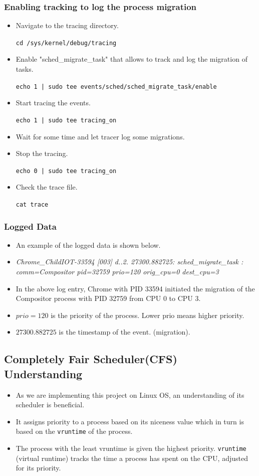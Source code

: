 \documentclass[12pt]{article}
\begin{document}
\subsubsection{Enabling tracking to log the process migration}
\begin{itemize}
    \item Navigate to the tracing directory. 
    
    \texttt{cd /sys/kernel/debug/tracing}
    \item Enable "sched\_migrate\_task" that allows to track and log the migration of tasks.

    \texttt{echo 1 | sudo tee events/sched/sched_migrate_task/enable}
    \item Start tracing the events. 
    
    \texttt{echo 1 | sudo tee tracing_on}
    \item Wait for some time and let tracer log some migrations.
    \item Stop the tracing. 
    
    \texttt{echo 0 | sudo tee tracing_on}
    \item Check the trace file. 
    
    \texttt{cat trace}
\end{itemize}
\subsubsection{Logged Data}
\begin{itemize}
    \item An example of the logged data is shown below.
    \item \textit{Chrome\_ChildIOT-33594   [003] d..2. 27300.882725: sched\_migrate\_task : comm=Compositor pid=32759 prio=120 orig\_cpu=0 dest\_cpu=3}
    \item In the above log entry, Chrome with PID 33594 initiated the migration of the Compositor process with PID 32759 from CPU 0 to CPU 3.
    \item $prio =120$ is the priority of the process. Lower prio means higher priority.
    \item $27300.882725$ is the timestamp of the event. (migration).
\end{itemize}
\subsection{Completely Fair Scheduler(CFS) Understanding}
\begin{itemize}
    \item As we are implementing this project on Linux OS, an understanding of its scheduler is beneficial.
    \item It assigns priority to a process based on its niceness value which in turn is based on the \texttt{vruntime} of the process.
    \item The process with the least vruntime is given the highest priority. \texttt{vruntime} (virtual runtime) tracks the time a process has spent on the CPU, adjusted for its priority.
\end{itemize}
\end{document}
